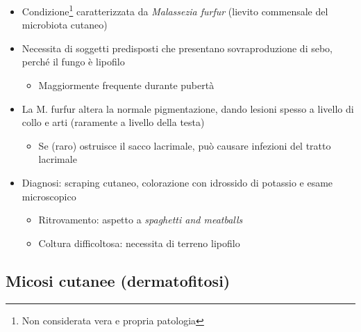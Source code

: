 \documentclass[italian,]{article}
\providecommand{\tightlist}{%
  \setlength{\itemsep}{0pt}\setlength{\parskip}{0pt}}
\begin{document}
\begin{itemize}
\tightlist
\item
  Condizione\footnote{Non considerata vera e propria patologia}
  caratterizzata da \emph{Malassezia furfur} (lievito commensale del
  microbiota cutaneo)
\item
  Necessita di soggetti predisposti che presentano sovraproduzione di
  sebo, perché il fungo è lipofilo

  \begin{itemize}
  \tightlist
  \item
    Maggiormente frequente durante pubertà
  \end{itemize}
\item
  La M. furfur altera la normale pigmentazione, dando lesioni spesso a
  livello di collo e arti (raramente a livello della testa)

  \begin{itemize}
  \tightlist
  \item
    Se (raro) ostruisce il sacco lacrimale, può causare infezioni del
    tratto lacrimale
  \end{itemize}
\item
  Diagnosi: scraping cutaneo, colorazione con idrossido di potassio e
  esame microscopico

  \begin{itemize}
  \tightlist
  \item
    Ritrovamento: aspetto a \emph{spaghetti and meatballs}
  \item
    Coltura difficoltosa: necessita di terreno lipofilo
  \end{itemize}
\end{itemize}

\hypertarget{micosi-cutanee-dermatofitosi}{%
\subsection{Micosi cutanee
(dermatofitosi)}\label{micosi-cutanee-dermatofitosi}}
\end{document}
